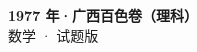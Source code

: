 \documentclass[zihao=-4, a4paper]{ctexart}
\begin{document}
\begin{center}
  {\Large\bfseries 1977 年·广西百色卷（理科）}\\[4pt]
  {\large 数学 · 试题版}
\end{center}
\medskip
{}

\end{document}
